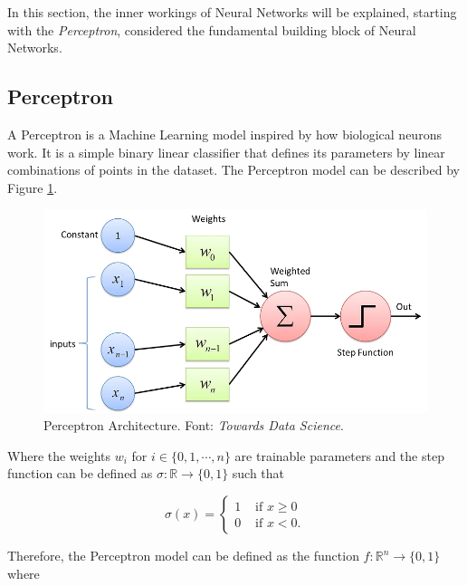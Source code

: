 In this section, the inner workings of Neural Networks will be explained, starting with the \emph{Perceptron}, considered the fundamental building block of Neural Networks.

\subsection{Perceptron}

A Perceptron is a Machine Learning model inspired by how biological neurons work. 
It is a simple binary linear classifier that defines its parameters by linear combinations of points in the dataset.
The Perceptron model can be described by Figure \ref{fig:perceptron}. 

\begin{figure}
    \centering
    \includegraphics[scale=0.4]{figuras/perceptron.png}
    \caption{Perceptron Architecture. Font: \emph{Towards Data Science\footnotemark}. \label{fig:perceptron}}
\end{figure}

Where the weights \(w_i\) for \(i \in \{0, 1, \cdots, n\}\) are trainable parameters and the step function can be defined as \(\sigma \colon \mathbb{R} \to \{0, 1\}\) such that

\begin{equation}
    \sigma(x) = 
    \begin{cases}
        1 & \text{ if } x \geq 0 \\
        0 & \text{ if } x < 0.
    \end{cases}
    \label{eq:step_function_perceptron}    
\end{equation}

Therefore, the Perceptron model can be defined as the function \(f \colon \mathbb{R}^n \to \{0, 1\}\) where

